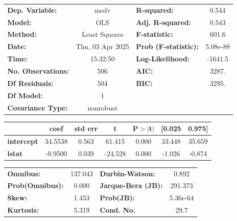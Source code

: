 \documentclass[11pt]{article}
\newcommand{\prompt}[4]{
        {\ttfamily\llap{{\color{#2}[#3]:\hspace{3pt}#4}}\vspace{-\baselineskip}}
    }
\begin{document}
            
\prompt{Out}{outcolor}{14}{}
    
    \begin{center}
\begin{tabular}{lclc}
\toprule
\textbf{Dep. Variable:}    &       medv       & \textbf{  R-squared:         } &     0.544   \\
\textbf{Model:}            &       OLS        & \textbf{  Adj. R-squared:    } &     0.543   \\
\textbf{Method:}           &  Least Squares   & \textbf{  F-statistic:       } &     601.6   \\
\textbf{Date:}             & Thu, 03 Apr 2025 & \textbf{  Prob (F-statistic):} &  5.08e-88   \\
\textbf{Time:}             &     15:32:50     & \textbf{  Log-Likelihood:    } &   -1641.5   \\
\textbf{No. Observations:} &         506      & \textbf{  AIC:               } &     3287.   \\
\textbf{Df Residuals:}     &         504      & \textbf{  BIC:               } &     3295.   \\
\textbf{Df Model:}         &           1      & \textbf{                     } &             \\
\textbf{Covariance Type:}  &    nonrobust     & \textbf{                     } &             \\
\bottomrule
\end{tabular}
\begin{tabular}{lcccccc}
                   & \textbf{coef} & \textbf{std err} & \textbf{t} & \textbf{P$> |$t$|$} & \textbf{[0.025} & \textbf{0.975]}  \\
\midrule
\textbf{intercept} &      34.5538  &        0.563     &    61.415  &         0.000        &       33.448    &       35.659     \\
\textbf{lstat}     &      -0.9500  &        0.039     &   -24.528  &         0.000        &       -1.026    &       -0.874     \\
\bottomrule
\end{tabular}
\begin{tabular}{lclc}
\textbf{Omnibus:}       & 137.043 & \textbf{  Durbin-Watson:     } &    0.892  \\
\textbf{Prob(Omnibus):} &   0.000 & \textbf{  Jarque-Bera (JB):  } &  291.373  \\
\textbf{Skew:}          &   1.453 & \textbf{  Prob(JB):          } & 5.36e-64  \\
\textbf{Kurtosis:}      &   5.319 & \textbf{  Cond. No.          } &     29.7  \\
\bottomrule
\end{tabular}
\end{center}
\end{document}
